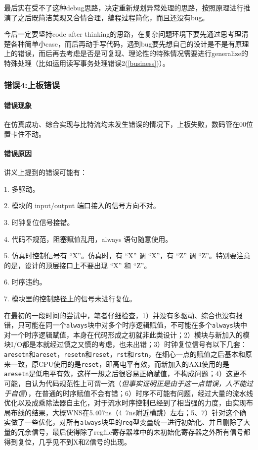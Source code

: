 \documentclass[UTF-8,twoside,c5size]{ctexart}
\begin{document}
	最后实在受不了这种debug思路，决定重新规划异常处理的思路，按照原理进行推演了之后既简洁美观又合情合理，编程过程简化，而且还没有bug。
	
	今后一定要坚持code after thinking的思路，在复杂问题环境下要先通过思考理清楚各种简单小case，而后再动手写代码，遇到bug要先想自己的设计是不是有原理上的错误，而后再去考虑是否是可复现、理论性的特殊情况需要进行generalize的特殊处理（比如运用读写事务处理错误2(\ref{business})）。
    	
   	\subsubsection{错误\textbf{4:}上板错误}
    	
    \paragraph{错误现象}\hfill
    
    在仿真成功、综合实现与比特流均未发生错误的情况下，上板失败，数码管在00位置卡住不动。
    
    \paragraph{错误原因}
    
    讲义上提到的错误可能有：
    
    1. 多驱动。
    
    2. 模块的 input/output 端口接入的信号方向不对。
    
    3. 时钟复位信号接错。
    
    4. 代码不规范，阻塞赋值乱用，always 语句随意使用。
    
    5. 仿真时控制信号有 “X”。仿真时，有 “X” 调 “X”，有 “Z” 调 “Z”。特别要注意的是，设计的顶层接口上不要出现 “X” 和 “Z”。
    
    6. 时序违约。
    
    7. 模块里的控制路径上的信号未进行复位。
    
    在最初的一段时间的尝试中，笔者仔细检查，1）并没有多驱动、综合也没有报错，只可能在同一个\texttt{always}块中对多个时序逻辑赋值，不可能在多个\texttt{always}块中对一个时序逻辑赋值，本身在代码形成之初就非此类设计；2）模块与新加入的模块I/O都是本就经过慎之又慎的考虑，也未出错；3）时钟复位信号有以下几套：\texttt{aresetn}和\texttt{areset}，\texttt{resetn}和\texttt{reset}，\texttt{rst}和\texttt{rstn}，在细心一点的赋值之后基本和原来一致，原CPU使用的是\texttt{reset}，即高电平有效，而新加入的AXI使用的是\texttt{aresetn}是低电平有效，这样一想之后很容易正确赋值，不构成问题；4）这更不可能，自认为代码规范性上可谓一流（\textsl{但事实证明正是由于这一点错误，人不能过于自信}），在普通的时序赋值不会有错；6）时序不可能有问题，经过大量的流水线优化以及成乘除法器自主化，对于流水时序控制已经到了相当强的力度，由实现布局布线的结果，大概WNS在5.407ns（4~7ns附近横跳）左右；5、7）针对这个确实做了一些优化，对所有\texttt{always}块里的\texttt{reg}型变量统一进行初始化、并且删除了大量的冗余信号，最后使得除了regfile寄存器堆中的未初始化寄存器之外所有信号都得到复位，几乎见不到X和Z信号的出现。
    
\end{document}
